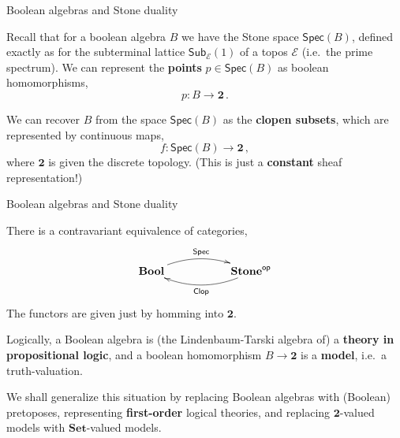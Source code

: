 \documentclass{beamer}
\newcommand{\E}{\ensuremath{\mathcal{E}}}
\newcommand{\myemph}[1]{\textbf{#1}}    %
\begin{document}
\begin{frame}{Boolean algebras and Stone duality}


Recall that for a boolean algebra $B$ we have the Stone space $\mathsf{Spec}(B)$,  defined exactly as for the subterminal lattice $\mathsf{Sub}_{\E}(1)$ of a topos $\E$ (i.e.\ the prime spectrum).  We can represent the \myemph{points} $p\in \mathsf{Spec}(B)$ as boolean homomorphisms,
\[
p : B\to \mathbf{2}\,.
\]

We can recover $B$ from the space $\mathsf{Spec}(B)$ as the \myemph{clopen subsets}, which are represented by continuous maps,
\[
f : \mathsf{Spec}(B)\to \mathbf{2}\,,
\]
where $\mathbf{2}$ is given the discrete topology. (This is just a \myemph{constant} sheaf representation!)


\end{frame}
\begin{frame}{Boolean algebras and Stone duality}

There is a contravariant equivalence of categories,
\[
\xymatrix{ 
\mathbf{Bool}  \ar@/{}^{1pc}/[rr]^{\mathsf{Spec}}     &&  \mathbf{Stone}^{\mathsf{op}}  \ar@/{}^{1pc}/[ll]^{\mathsf{Clop}}  \\
} 
\]
The functors are given just by homming into $\mathbf{2}$.
\medskip

Logically, a Boolean algebra is (the Lindenbaum-Tarski algebra of) a \myemph{theory in propositional logic}, and a boolean homomorphism $B\to \mathbf{2}$ is a \myemph{model}, i.e.\ a truth-valuation.
\medskip

We shall generalize this situation by replacing Boolean algebras with (Boolean) pretoposes, representing \myemph{first-order} logical theories, and replacing $\mathbf{2}$-valued models with $\mathbf{Set}$-valued models.

\end{frame}
\end{document}

